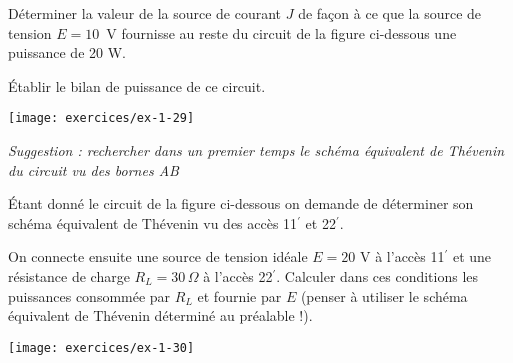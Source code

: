 \begin{exercise}{}\label{ex:mg-12}
Déterminer la valeur de la source de courant $J$ de façon à ce
que la source de tension $E=10$~V fournisse au reste du circuit de la
 figure ci-dessous une puissance de 20 W.

Établir le bilan de puissance de ce circuit.
\begin{center}
\texttt{[image: exercices/ex-1-29]}
\end{center}

{\em Suggestion : rechercher dans un premier temps le schéma
	équivalent de Thévenin du circuit vu des bornes AB}
\end{exercise}

\begin{exercise}{}\label{ex:mg-13}
Étant donné le circuit de la  figure ci-dessous on demande  de
déterminer son schéma équivalent de Thévenin vu des accès 11$^{'}$ et
22$^{'}$.

On connecte ensuite une source de tension idéale $E=20$ V à l'accès
11$^{'}$ et une résistance de charge $R_L=30\, \Omega$ à l'accès
22$^{'}$. Calculer dans ces conditions les puissances consommée par
$R_L$ et fournie par $E$ (penser à utiliser le schéma équivalent de
Thévenin déterminé au préalable !).
\begin{center}
	\texttt{[image: exercices/ex-1-30]}
\end{center}
\end{exercise}

